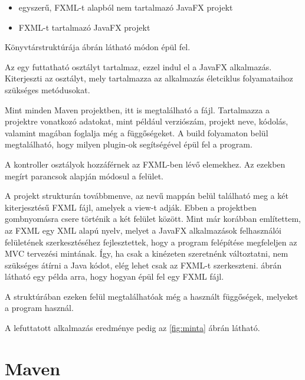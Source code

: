 \begin{itemize}
\setlength\itemsep{0em}
\item egyszerű, FXML-t alapból nem tartalmazó JavaFX projekt 
\item FXML-t tartalmazó JavaFX projekt 
\end{itemize}

Könyvtárstruktúrája  ábrán látható módon épül fel.



Az  egy futtatható osztályt tartalmaz, ezzel indul el a JavaFX alkalmazás.
Kiterjeszti az  osztályt, mely tartalmazza az alkalmazás életciklus folyamataihoz szükséges metódusokat.

Mint minden Maven projektben, itt is megtalálható a  fájl.
Tartalmazza a projektre vonatkozó adatokat, mint például verziószám, projekt neve, kódolás, valamint magában foglalja még a függőségeket.
A build folyamaton belül megtalálható, hogy milyen plugin-ok segítségével épül fel a program. 

A kontroller osztályok hozzáférnek az FXML-ben lévő elemekhez.
Az ezekben megírt parancsok alapján módosul a felület. 

A projekt strukturán továbbmenve, az  nevű mappán belül található meg a két  kiterjesztésű FXML fájl, amelyek a view-t adják.
Ebben a projektben gombnyomásra csere történik a két felület között.
Mint már korábban említettem, az FXML egy XML alapú nyelv, melyet a JavaFX alkalmazások felhasználói felületének szerkesztéséhez fejlesztettek, hogy a program felépítése megfeleljen az MVC tervezési mintának.
Így, ha csak a kinézeten szeretnénk változtatni, nem szükséges átírni a Java kódot, elég lehet csak az FXML-t szerkeszteni.
 ábrán látható egy példa arra, hogy hogyan épül fel egy FXML fájl.


A struktúrában ezeken felül megtalálhatóak még a használt függőségek, melyeket a program használ. 

A lefuttatott alkalmazás eredménye pedig az \ref{fig:minta} ábrán látható.

%



\section{Maven}

